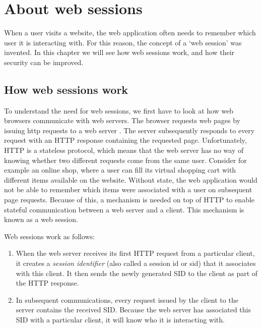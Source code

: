 \chapter{About web sessions}

When a user visits a website, the web application often needs to remember which user it is interacting with. For this reason, the concept of a `web session' was invented. In this chapter we will see how web sessions work, and how their security can be improved.

\section{How web sessions work}\label{session-management}

To understand the need for web sessions, we first have to look at how web browsers communicate with web servers. The browser requests web pages by issuing \gls{http} requests to a web server \cite{Kurose2008}. The server subsequently responds to every request with an HTTP response containing the requested page. Unfortunately, HTTP is a stateless protocol, which means that the web server has no way of knowing whether two different requests come from the same user. Consider for example an online shop, where a user can fill its virtual shopping cart with different items available on the website. Without state, the web application would not be able to remember which items were associated with a user on subsequent page requests. Because of this, a mechanism is needed on top of HTTP to enable stateful communication between a web server and a client. This mechanism is known as a web session.

Web sessions work as follows:
\begin{enumerate}
	\item When the web server receives its first HTTP request from a particular client, it creates a \emph{session identifier} (also called a \gls{session id} or \gls{sid}) that it associates with this client. It then sends the newly generated SID to the client as part of the HTTP response.
	\item In subsequent communications, every request issued by the client to the server contains the received SID. Because the web server has associated this SID with a particular client, it will know who it is interacting with.
\end{enumerate}

